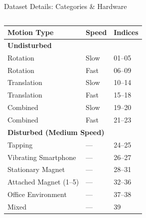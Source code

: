 \documentclass[aspectratio=169,xcolor=dvipsnames]{beamer}
\begin{document}
\begin{frame}{Dataset Details: Categories \& Hardware}
\scriptsize
\begin{columns}[T]
  \begin{column}{0.48\textwidth}
      \begin{tabular}{|p{}|p{}|p{}|}
        \hline
        \textbf{Motion Type} & \textbf{Speed} & \textbf{Indices} \\ \hline
        \multicolumn{3}{|l|}{\textbf{Undisturbed}} \\ \hline
        Rotation    & Slow & 01–05 \\ 
        Rotation    & Fast & 06–09 \\
        Translation & Slow & 10–14 \\
        Translation & Fast & 15–18 \\
        Combined    & Slow & 19–20 \\
        Combined    & Fast & 21–23 \\ \hline
        \multicolumn{3}{|l|}{\textbf{Disturbed (Medium Speed)}} \\ \hline
        Tapping               & — & 24–25 \\
        Vibrating Smartphone  & — & 26–27 \\
        Stationary Magnet     & — & 28–31 \\
        Attached Magnet (1–5) & — & 32–36 \\
        Office Environment    & — & 37–38 \\
        Mixed                 & — & 39     \\ \hline
      \end{tabular}
    
  \end{column}


\end{columns}
\end{frame}
\end{document}
